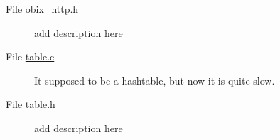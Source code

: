 \label{todo__todo000008}
\hypertarget{todo__todo000008}{}
 \begin{description}
\item[File \hyperlink{obix__http_8h}{obix\_\-http.h} ]add description here

\end{description}


\label{todo__todo000009}
\hypertarget{todo__todo000009}{}
 \begin{description}
\item[File \hyperlink{table_8c}{table.c} ]It supposed to be a hashtable, but now it is quite slow.

\end{description}


\label{todo__todo000010}
\hypertarget{todo__todo000010}{}
 \begin{description}
\item[File \hyperlink{table_8h}{table.h} ]add description here

\end{description}
